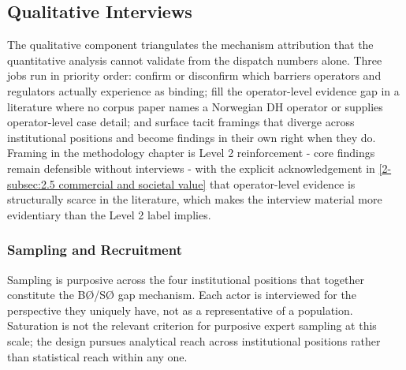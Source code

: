 



\subsection{Qualitative Interviews}
\label{3-subsec:3.5 interviews}

The qualitative component triangulates the mechanism attribution that the quantitative analysis cannot validate from the dispatch numbers alone. Three jobs run in priority order: confirm or disconfirm which barriers operators and regulators actually experience as binding; fill the operator-level evidence gap in a literature where no corpus paper names a Norwegian DH operator or supplies operator-level case detail; and surface tacit framings that diverge across institutional positions and become findings in their own right when they do. Framing in the methodology chapter is Level 2 reinforcement - core findings remain defensible without interviews - with the explicit acknowledgement in \autoref{2-subsec:2.5 commercial and societal value} that operator-level evidence is structurally scarce in the literature, which makes the interview material more evidentiary than the Level 2 label implies.



\subsubsection{Sampling and Recruitment}
\label{3-subsec:3.5.1 sampling}

Sampling is purposive across the four institutional positions that together constitute the BØ/SØ gap mechanism. Each actor is interviewed for the perspective they uniquely have, not as a representative of a population. Saturation is not the relevant criterion for purposive expert sampling at this scale; the design pursues analytical reach across institutional positions rather than statistical reach within any one.

